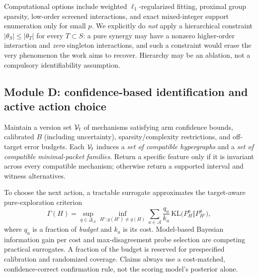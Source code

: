 \documentclass[11pt,a4paper]{article}
\newcommand{\A}{\mathcal{A}}\newcommand{\M}{\mathcal{M}}
\newcommand{\KL}{\mathrm{KL}}\newcommand{\TV}{\mathrm{TV}}
\theoremstyle{definition}\newtheorem{definition}[theorem]{Definition}
\theoremstyle{remark}\newtheorem{remark}[theorem]{Remark}
\begin{document}
Computational options include weighted $\ell_1$-regularized fitting, proximal group sparsity, low-order screened interactions, and exact mixed-integer support enumeration only for small $p$. We explicitly do \emph{not} apply a hierarchical constraint $|\theta_S|\le|\theta_T|$ for every $T\subset S$: a pure synergy may have a nonzero higher-order interaction and \emph{zero} singleton interactions, and such a constraint would erase the very phenomenon the work aims to recover. Hierarchy may be an ablation, not a compulsory identifiability assumption.

\subsection{Module D: confidence-based identification and active action choice}
Maintain a version set $\mathcal{V}_t$ of mechanisms satisfying arm confidence bounds, calibrated $B$ (including uncertainty), sparsity/complexity restrictions, and off-target error budgets. Each $\mathcal{V}_t$ induces a \emph{set of compatible hypergraphs} and a \emph{set of compatible minimal-packet families}. Return a specific feature only if it is invariant across every compatible mechanism; otherwise return a supported interval and witness alternatives.

To choose the next action, a tractable surrogate approximates the target-aware pure-exploration criterion
\begin{equation}\label{eq:design}
 \Gamma(H)=\sup_{q\in\Delta_{\A}}
 \inf_{H':g(H')\ne g(H)}\sum_{a\in\A}\frac{q_a}{k_a}\,
 \KL\big(P_H^a\Vert P_{H'}^a\big),
\end{equation}
where $q_a$ is a fraction of \emph{budget} and $k_a$ is its cost. Model-based Bayesian information gain per cost and max-disagreement probe selection are competing practical surrogates. A fraction of the budget is reserved for prespecified calibration and randomized coverage. Claims always use a cost-matched, confidence-correct confirmation rule, not the scoring model's posterior alone.
\end{document}
